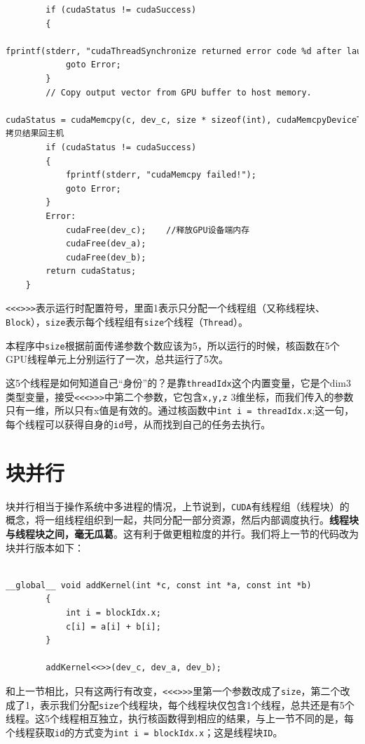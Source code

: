 \documentclass[UTF8,a4paper,12pt]{ctexbook}
\begin{document}
\begin{lstlisting}
		if (cudaStatus != cudaSuccess)    
		{   
			fprintf(stderr, "cudaThreadSynchronize returned error code %d after launching addKernel!\n", cudaStatus);   
			goto Error;   
		}   
		// Copy output vector from GPU buffer to host memory.   
		cudaStatus = cudaMemcpy(c, dev_c, size * sizeof(int), cudaMemcpyDeviceToHost);      //拷贝结果回主机   
		if (cudaStatus != cudaSuccess)    
		{   
			fprintf(stderr, "cudaMemcpy failed!");   
			goto Error;   
		}   
		Error:   
			cudaFree(dev_c);    //释放GPU设备端内存   
			cudaFree(dev_a);   
			cudaFree(dev_b);       
		return cudaStatus;   
	} 
		\end{lstlisting}
		
	\verb|<<<>>>|表示运行时配置符号，里面1表示只分配一个线程组（又称线程块、\verb|Block|），\verb|size|表示每个线程组有\verb|size|个线程（\verb|Thread|）。
	
	本程序中\verb|size|根据前面传递参数个数应该为5，所以运行的时候，核函数在5个GPU线程单元上分别运行了一次，总共运行了5次。
	
	这5个线程是如何知道自己“身份”的？是靠\verb|threadIdx|这个内置变量，它是个dim3类型变量，接受\verb|<<<>>>|中第二个参数，它包含\verb|x,y,z| 3维坐标，而我们传入的参数只有一维，所以只有x值是有效的。通过核函数中\verb|int i = threadIdx.x|;这一句，每个线程可以获得自身的\verb|id|号，从而找到自己的任务去执行。
	
	
	\section{块并行}
		块并行相当于操作系统中多进程的情况，上节说到，\verb|CUDA|有线程组（线程块）的概念，将一组线程组织到一起，共同分配一部分资源，然后内部调度执行。\textbf{线程块与线程块之间，毫无瓜葛}。这有利于做更粗粒度的并行。我们将上一节的代码改为块并行版本如下：
			
			\begin{lstlisting}
		__global__ void addKernel(int *c, const int *a, const int *b)   
		{   
			int i = blockIdx.x;   
			c[i] = a[i] + b[i];   
		}   
		
		addKernel<<>>(dev_c, dev_a, dev_b);
			\end{lstlisting}
		
		和上一节相比，只有这两行有改变，\verb|<<<>>>|里第一个参数改成了\verb|size|，第二个改成了1，表示我们分配\verb|size|个线程块，每个线程块仅包含1个线程，总共还是有5个线程。这5个线程相互独立，执行核函数得到相应的结果，与上一节不同的是，每个线程获取\verb|id|的方式变为\verb|int i = blockIdx.x|；这是线程块\verb|ID|。	  
	
\end{document}
